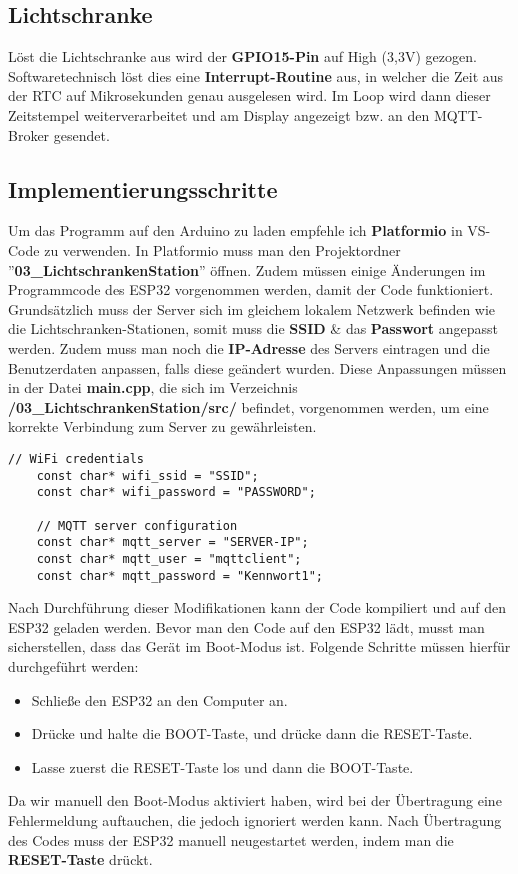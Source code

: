\subsection{Lichtschranke}
Löst die Lichtschranke aus wird der \textbf{GPIO15-Pin} auf High (3,3V) gezogen. Softwaretechnisch löst dies eine \textbf{Interrupt-Routine } aus, in welcher die Zeit aus der \ac{RTC} auf Mikrosekunden genau ausgelesen wird. Im Loop wird dann dieser Zeitstempel weiterverarbeitet und am Display angezeigt bzw. an den MQTT-Broker gesendet.


\subsection{Implementierungsschritte}
Um das Programm auf den Arduino zu laden empfehle ich \textbf{Platformio} in VS-Code zu verwenden. In Platformio muss man den Projektordner ''\textbf{03\_LichtschrankenStation}'' öffnen. Zudem müssen einige Änderungen im Programmcode des ESP32 vorgenommen werden, damit der Code funktioniert. Grundsätzlich muss der Server sich im gleichem lokalem Netzwerk befinden wie die Lichtschranken-Stationen, somit muss die \textbf{SSID} \& das \textbf{Passwort} angepasst werden. Zudem muss man noch die \textbf{IP-Adresse} des Servers eintragen und die Benutzerdaten anpassen, falls diese geändert wurden. Diese Anpassungen müssen in der Datei \textbf{main.cpp}, die sich im Verzeichnis \textbf{/03\_LichtschrankenStation/src/} befindet, vorgenommen werden, um eine korrekte Verbindung zum Server zu gewährleisten.

\begin{lstlisting}[language=myCpp]
	// WiFi credentials
	const char* wifi_ssid = "SSID";          
	const char* wifi_password = "PASSWORD";  
	
	// MQTT server configuration
	const char* mqtt_server = "SERVER-IP";  
	const char* mqtt_user = "mqttclient";    
	const char* mqtt_password = "Kennwort1";  
\end{lstlisting}

Nach Durchführung dieser Modifikationen kann der Code kompiliert und auf den ESP32 geladen werden. Bevor man den Code auf den ESP32 lädt, musst man sicherstellen, dass das Gerät im Boot-Modus ist. Folgende Schritte müssen hierfür durchgeführt werden:

\begin{itemize}
	\item Schließe den ESP32 an den Computer an.
	\item Drücke und halte die BOOT-Taste, und drücke dann die RESET-Taste.
	\item Lasse zuerst die RESET-Taste los und dann die BOOT-Taste.
\end{itemize}

Da wir manuell den Boot-Modus aktiviert haben, wird bei der Übertragung eine Fehlermeldung auftauchen, die jedoch ignoriert werden kann. Nach Übertragung des Codes muss der ESP32 manuell neugestartet werden, indem man die \textbf{RESET-Taste} drückt.